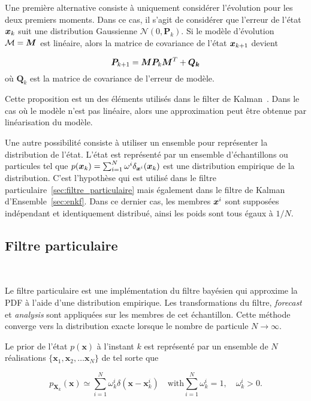 Une première alternative consiste à uniquement considérer l'évolution pour les deux premiers moments. Dans ce cas, il s'agit de considérer que l'erreur de l'état $\bm{x}_k$ suit une distribution Gaussienne $\mathcal{N} (0, \bm P_k)$. Si le modèle d'évolution $\mathcal{M} = \bm{M}$ est linéaire, alors la matrice de covariance de l'état $\bm{x}_{k+1}$ devient

\begin{equation*}
    \bm{P}_{k+1} = \bm{M} \bm{P}_{k} \bm{M}^T + \bm{Q_k}
\end{equation*}où $\bm Q_k$ est la matrice de covariance de l'erreur de modèle.

Cette proposition est un des éléments utilisés dans le filter de Kalman~\cite{kalman_filter}. Dans le cas où le modèle n'est pas linéaire, alors une approximation peut être obtenue par linéarisation du modèle.

Une autre possibilité consiste à utiliser un ensemble pour représenter la distribution de l'état. L'état est représenté par un ensemble d'échantillons ou particules tel que $p(\bm{x}_k)  = \sum_{i=1}^{N} \omega^i \delta_{\bm{x}^i}(\bm{x}_k)$ est une distribution empirique de la distribution. C'est l'hypothèse qui est utilisé dans le filtre particulaire~\ref{sec:filtre_particulaire} mais également dans le filtre de Kalman d'Ensemble~\ref{sec:enkf}. Dans ce dernier cas, les membres $\bm{x}^i$ sont supposées indépendant et identiquement distribué, ainsi les poids sont tous égaux à $1/N$.

\subsection{Filtre particulaire}~\label{sec:filtre_particulaire}

Le filtre particulaire est une implémentation du filtre bayésien qui approxime la PDF à l'aide d'une distribution empirique. Les transformations du filtre, \textit{forecast} et \textit{analysis} sont appliquées sur les membres de cet échantillon.
Cette méthode converge vers la distribution exacte lorsque le nombre de particule $N \to \infty$.

Le prior de l'état $p(\bm x)$ à l'instant $k$ est représenté par un ensemble de $N$ réalisations $\{\bm x_1, \bm x_2, \dots \bm x_N\}$ de tel sorte que

\begin{equation*}
    p_{\bm X_k}(\bm x) \simeq \sum_{i=1}^N \omega^i_k \delta(\bm x - \bm x_k^i) \quad \text{with} \sum_{i=1}^N \omega^i_k = 1, \quad \omega^i_k > 0.
\end{equation*}

